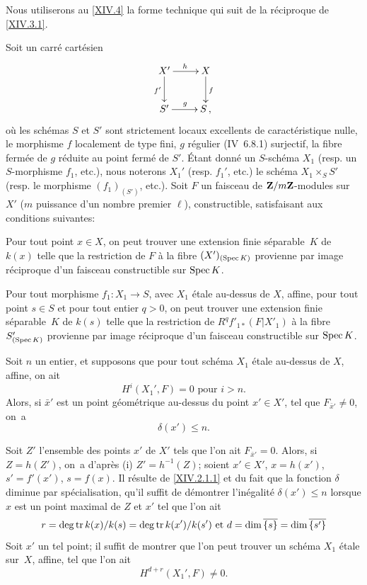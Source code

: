 Nous utiliserons au \numero \ref{XIV.4} la forme technique qui suit de la r\'eciproque de \ref{XIV.3.1}.

\begin{proposition} \label{XIV.3.5}
Soit un carr\'e cart\'esien
$$
\xymatrix{
X^{\prime}\ar[r]^h\ar[d]_{f^{\prime}} &X\ar[d]^f\\
S^{\prime}\ar[r]^g &S\,,
}
$$
o\`u les sch\'emas $S$ et $S'$ sont strictement locaux excellents de caract\'eristique nulle, le morphisme $f$ localement de type fini, $g$ r\'egulier (\textup{\EGA IV~6.8.1}) surjectif, la fibre ferm\'ee de $g$ r\'eduite au point ferm\'e de $S'$. \'Etant donn\'e un $S$-sch\'ema $X_1$ (resp. un $S$-morphisme $f_1$, etc.), nous noterons $X_1'$ (resp. $f_1'$, etc.) le sch\'ema $X_1 \times_S S'$ (resp. le morphisme $(f_1)_{(S')}$, etc.). Soit $F$ un faisceau de $\mathbf{Z}/m\mathbf{Z}$-modules sur $X'$ ($m$ puissance d'un nombre premier $\ell$), constructible, satisfaisant aux conditions suivantes:
\begin{enumeratei}
\item
Pour tout point $x \in X$, on peut trouver une extension finie s\'eparable~$K$ de $k(x)$ telle que la restriction de $F$ \`a la fibre $(X')_{(\operatorname{Spec} K)}$ provienne par image r\'eciproque d'un faisceau constructible sur $\operatorname{Spec} K$.
\item
Pour tout morphisme $f_1: X_1 \to S$, avec $X_1$ \'etale au-dessus de $X$, affine, pour tout point $s \in S$ et pour tout entier $q>0$, on peut trouver une extension finie s\'eparable~$K$ de $k(s)$ telle que la restriction de $R^q f'_{1*}(F|X'_1)$ \`a la fibre $S'_{(\operatorname{Spec} K)}$ provienne par image r\'eciproque d'un faisceau constructible sur $\operatorname{Spec} K$.
\end{enumeratei}

Soit $n$ un entier, et supposons que pour tout sch\'ema $X_1$ \'etale au-dessus de $X$, affine, on ait
$$
H^i(X_1', F)=0 \text{ pour } i>n.
$$
Alors, si $\bar{x}'$ est un point g\'eom\'etrique au-dessus du point $x' \in X'$, tel que $F_{\bar{x}'} \neq 0$, on~a
$$
\delta(x') \leq n.
$$
\end{proposition}

Soit $Z'$ l'ensemble des points $x'$ de $X'$ tels que l'on ait $F_{\bar{x}'} = 0$. Alors, si $Z=h(Z')$, on~a d'apr\`es \textup{(i)} $Z' = h^{-1}(Z)$; soient $x' \in X'$, $x=h(x')$, $s'=f'(x')$, $s=f(x)$. Il r\'esulte de \ref{XIV.2.1.1} et du fait que la fonction $\delta$ diminue par sp\'ecialisation, qu'il suffit de d\'emontrer l'in\'egalit\'e $\delta(x') \leq n$ lorsque $x$ est un point maximal de $Z$ et $x'$ tel que l'on ait
$$r=\deg \operatorname{tr} k(x)/k(s) = \deg \operatorname{tr} k(x')/k(s') \text{ et }d=\dim \overline{\{s\}} = \dim\overline{\{s'\}}$$
Soit $x'$ un tel point; il suffit de montrer que l'on peut trouver un sch\'ema $X_1$ \'etale sur~$X$, affine, tel que l'on ait
$$
H^{d+r}(X_1', F) \neq 0.
$$

